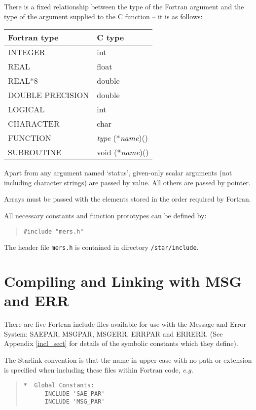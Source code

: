 \documentclass[twoside,11pt]{article}
\newcommand{\htmlref}[2]{#1}
\newcommand{\latex}[1]{#1}
\newcommand{\xlabel}[1]{}
\renewcommand{\_}{\texttt{\symbol{95}}}
\begin{document}
There is a fixed relationship between the type of the Fortran 
argument and the type of the argument supplied to the C function -- it is 
as follows:
\begin{center}
\begin{tabular}{|l|l|}
\hline
Fortran type & C type \\
\hline
INTEGER & int \\
REAL & float \\
REAL*8 & double \\
DOUBLE PRECISION & double \\
LOGICAL & int \\
CHARACTER & char \\
FUNCTION & \textit{type} (*\textit{name})() \\
SUBROUTINE & void (*\textit{name})() \\
\hline
\end{tabular}
\end{center}

Apart from any argument named `status', given-only scalar arguments (not
including character strings) are passed by value. 
All others are passed by pointer.

Arrays must be passed with the elements stored in the order required by Fortran.

All necessary constants and function prototypes can be defined by:
\begin{quote} \begin{verbatim}
#include "mers.h"
\end{verbatim} \end{quote}
The header file \texttt{mers.h} is contained in directory
\texttt{/star/include}.

\section{\xlabel{compiling_and_linking_with_msg_and_err}Compiling and Linking with MSG and ERR 
\label{compiling_and_linking}\xlabel{compiling_and_linking}}
There are five Fortran include files available for use with the Message and
Error System: 
\htmlref{SAE\_PAR, MSG\_PAR, MSG\_ERR, ERR\_PAR and ERR\_ERR}{incl_sect}.
\latex{(See Appendix \ref{incl_sect} for details of the symbolic constants 
which they define).}

The Starlink convention
is that the name in upper case with no path or extension is specified when 
including these files within Fortran code, 
\textit{e.g.}
\begin{quote}
\begin{small}
\begin{verbatim}
*  Global Constants:
      INCLUDE 'SAE_PAR'
      INCLUDE 'MSG_PAR'
\end{verbatim}
\end{small}
\end{quote}
\end{document}
